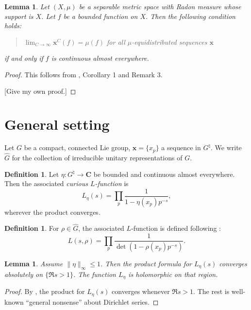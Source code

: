 \documentclass{article}
\newcommand{\bC}{\mathbf{C}}
\newcommand{\bx}{\boldsymbol{x}}
\newtheorem{lemma}[subsection]{Lemma}
\theoremstyle{definition}
\newtheorem{definition}[subsection]{Definition}
\begin{document}
\begin{lemma}\label{debruijn-post}
Let $(X,\mu)$ be a separable metric space with Radon measure whose support is 
$X$. Let $f$ be a bounded function on $X$. Then the following condition holds:
\begin{quote}
$\lim_{C\to \infty} \bx^C(f) = \mu(f)$ for all $\mu$-equidistributed sequences $\bx$
\end{quote}
if and only if $f$ is continuous almost everywhere.
\end{lemma}
\begin{proof}
This follows from \cite{chersi-volcic-1992}, Corollary 1 and Remark 3. 

[Give my own proof.]
\end{proof}





\section{General setting}

Let $G$ be a compact, connected Lie group, $\bx=\{x_p\}$ a sequence in 
$G^\natural$. We write $\widehat G$ for the collection of irreducible unitary 
representations of $G$. 

\begin{definition}
Let $\eta\colon G^\natural \to \bC$ be bounded and continuous almost 
everywhere. Then the associated \emph{curious $L$-function} is 
\[
	L_\eta(s) = \prod_p \frac{1}{1-\eta(x_p) p^{-s}} ,
\]
wherever the product converges. 
\end{definition}

\begin{definition}
For $\rho\in \widehat G$, the associated $L$-function is defined following 
\cite{serre-1968}:
\[
	L(s,\rho) = \prod_p \frac{1}{\det(1-\rho(x_p) p^{-s})} .
\]
\end{definition}

\begin{lemma}
Assume $\|\eta\|_\infty \leqslant 1$. Then the product formula for 
$L_\eta(s)$ converges absolutely on $\{\Re s>1\}$. The function $L_\eta$ is 
holomorphic on that region. 
\end{lemma}
\begin{proof}
By \cite[\S3.7, Th.~5]{knopp-1956}, the product for $L_\eta(s)$ converges 
whenever $\Re s>1$. The rest is well-known ``general nonsense'' about Dirichlet 
series. 
\end{proof}
\end{document}
